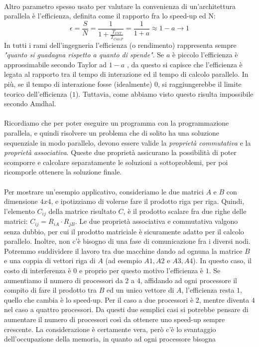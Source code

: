\\
Altro parametro spesso usato per valutare la convenienza di un'architettura parallela è l'efficienza, definita come il rapporto fra lo speed-up ed N:
\[\epsilon=\frac{S}{N}=\frac{1}{1+\frac{T_{INT}}{T_{CalcP}}}=\frac{1}{1+a}\approx1-a\rightarrow1\]
In tutti i rami dell'ingegneria l'efficienza (o rendimento) rappresenta sempre \textit{"quanto si guadagna rispetto a
quanto di spende"}. Se \(a\) è piccolo l'efficienza è approssimabile secondo Taylor ad \(1-a\) , da questo si
capisce che l'efficienza è legata al rapporto tra il tempo di interazione ed il tempo di calcolo
parallelo. In più, se il tempo di interazione fosse (idealmente) \(0\), si raggiungerebbe il limite teorico
dell'efficienza (\(1\)). Tuttavia, come abbiamo visto questo risulta impossibile secondo Amdhal.
\\
\\
Ricordiamo che per poter eseguire un programma con la programmazione parallela, e quindi risolvere un
problema che di solito ha una soluzione sequenziale in modo parallelo, devono essere valide la \textit{proprietà commutativa} e la \textit{proprietà
associativa}. Queste due proprietà assicurano la possibilità di poter scomporre e calcolare separatamente le soluzioni a sottoproblemi, per poi ricomporle ottenere la soluzione finale.
\\
\\
Per mostrare un'esempio applicativo, consideriamo  le due matrici \(A\) e \(B\) con dimensione \(4x4\), e ipotizziamo di volerne fare il prodotto riga per
riga. Quindi, l'elemento \(C_{ij}\) della matrice risultato \(C\), è il prodotto scalare fra due righe delle matrici: \(C_{ij}=R_{iA} \cdot R_{jB}\). Le due proprietà associativa e commutativa valgono senza dubbio, per cui il prodotto matriciale è sicuramente adatto per il calcolo parallelo. Inoltre, non c'è bisogno di una fase di comunicazione fra i diversi nodi. Potremmo suddividere il
lavoro tra due macchine dando ad ognuna la matrice \(B\) e una coppia di vettori riga di \(A\) (ad esempio \(A1,A2\) e \(A3,A4\)). In questo caso, il costo di interferenza è \(0\) e proprio per questo motivo l'efficienza è \(1\). Se aumentiamo il numero di processori da 2 a 4, affidando ad ogni processore il compito di fare il prodotto tra \(B\) ed un unico vettore di \(A\), l'efficienza resta \(1\), quello che cambia è lo speed-up. Per il caso a due processori è \(2\), mentre diventa \(4\) nel caso a quattro processori. Da
questi due semplici casi si potrebbe pensare di aumentare il numero di processori così da ottenere uno speed-up sempre crescente. La considerazione è certamente vera, però c'è lo svantaggio dell'occupazione della memoria, in quanto ad ogni processore bisogna
